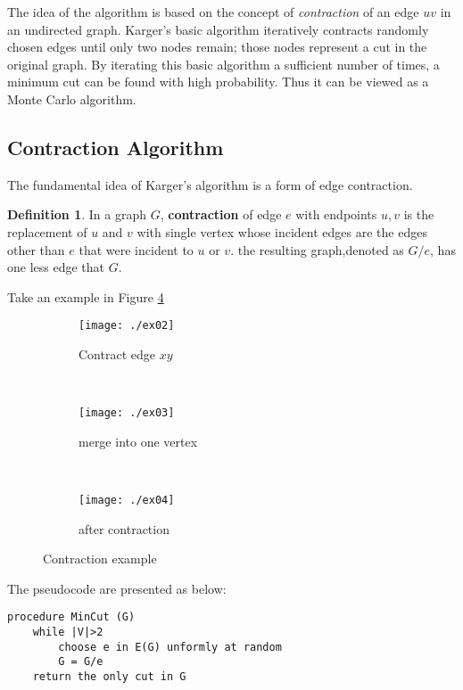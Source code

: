 \documentclass[11pt]{article}
\theoremstyle{plain}
\theoremstyle{definition}
\newtheorem{defn}[thm]{Definition}
\theoremstyle{remark}
\begin{document}
The idea of the algorithm is based on the concept of \textit{contraction} of an edge $ uv $ in an undirected graph. Karger's basic algorithm iteratively contracts randomly chosen edges until only two nodes remain; those nodes represent a cut in the original graph. By iterating this basic algorithm a sufficient number of times, a minimum cut can be found with high probability. Thus it can be viewed as a Monte Carlo algorithm.

\subsection{Contraction Algorithm}
	The fundamental idea of Karger's algorithm is a form of edge contraction.
	
	\begin{defn}
	In a graph $ G $, \textbf{contraction} of edge $ e $ with endpoints $ u,v $ is the replacement of $ u $ and $ v $ with single vertex whose incident edges are the edges other than $ e $ that were incident to $ u $ or $ v $. the resulting graph,denoted as $ G/e $, has one less edge that $ G $.
	\end{defn}
	
	Take an example in Figure \ref{fig:contraction example}
	
	\begin{figure}[h]
	         \centering
	         \begin{subfigure}[b]{0.3\textwidth}
	                 \centering
	                 \texttt{[image: ./ex02]}
	                 \caption{Contract edge $ xy $}
	                 \label{fig:orignal graph}
	         \end{subfigure}
	       	~
	         \begin{subfigure}[b]{0.3\textwidth}
	                 \centering
	                 \texttt{[image: ./ex03]}
	                 \caption{merge into one vertex}
	                 \label{fig:contract xy}
	         \end{subfigure}
	        ~
	         \begin{subfigure}[b]{0.3\textwidth}
	                 \centering
	                 \texttt{[image: ./ex04]}
	                 \caption{after contraction}
	                 \label{fig:after contraction}
	         \end{subfigure}
	         \caption{Contraction example}\label{fig:contraction example}
	\end{figure}
\newpage
	The pseudocode are presented as below:
	\begin{center}
	\begin{Verbatim}[frame = single]
	procedure MinCut (G)
	while |V|>2
		choose e in E(G) unformly at random
		G = G/e
	return the only cut in G
	\end{Verbatim}
	\end{center}
	
\end{document}
